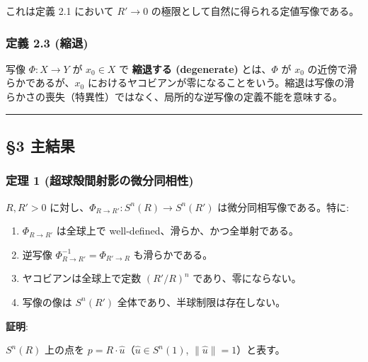 \documentclass[
  a4paper]{ltjsarticle}
\providecommand{\tightlist}{%
  \setlength{\itemsep}{0pt}\setlength{\parskip}{0pt}}
\begin{document}
これは定義 2.1 において \(R' \to 0\)
の極限として自然に得られる定値写像である。

\subsubsection{定義 2.3 (縮退)}\label{ux5b9aux7fa9-2.3-ux7e2eux9000}

写像 \(\Phi : X \to Y\) が \(x_0 \in X\) で \textbf{縮退する
(degenerate)} とは、\(\Phi\) が \(x_0\) の近傍で滑らかであるが、\(x_0\)
におけるヤコビアンが零になることをいう。縮退は写像の滑らかさの喪失（特異性）ではなく、局所的な逆写像の定義不能を意味する。

\begin{center}\rule{0.5\linewidth}{0.5pt}\end{center}

\subsection{§3 主結果}\label{ux4e3bux7d50ux679c}

\subsubsection{定理 1
(超球殻間射影の微分同相性)}\label{ux5b9aux7406-1-ux8d85ux7403ux6bbbux9593ux5c04ux5f71ux306eux5faeux5206ux540cux76f8ux6027}

\(R, R' > 0\) に対し、\(\Phi_{R \to R'} : S^n(R) \to S^n(R')\)
は微分同相写像である。特に:

\begin{enumerate}
\def\labelenumi{(\roman{enumi})}
\tightlist
\item
  \(\Phi_{R \to R'}\) は全球上で
  well-defined、滑らか、かつ全単射である。\\
\item
  逆写像 \(\Phi_{R \to R'}^{-1} = \Phi_{R' \to R}\) も滑らかである。\\
\item
  ヤコビアンは全球上で定数 \((R'/R)^n\) であり、零にならない。\\
\item
  写像の像は \(S^n(R')\) 全体であり、半球制限は存在しない。
\end{enumerate}

\textbf{証明}:

\(S^n(R)\) 上の点を \(p = R \cdot \hat{u}\)（\(\hat{u} \in S^n(1)\),
\(\|\hat{u}\| = 1\)）と表す。
\end{document}
